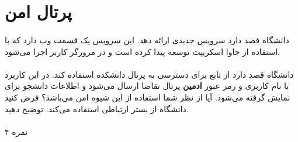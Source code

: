 \documentclass[../main.tex]{subfiles}
\begin{document}
\section{پرتال امن}

\paragraph{}
دانشگاه قصد دارد سرویس جدیدی ارائه دهد.
این سرویس یک قسمت وب دارد که با استفاده از جاوا اسکریپت توسعه پیدا
کرده است و در مرورگر کاربر اجرا می‌شود.

\paragraph{}
دانشگاه قصد دارد از تابع  برای دسترسی به پرتال دانشکده استفاده کند.
در این کاربرد با نام کاربری و رمز عبور \textbf{ادمین} پرتال تقاضا ارسال می‌شود و اطلاعات دانشجو برای نمایش گرفته می‌شود.
آیا از نظر شما استفاده از این شیوه امن می‌باشد؟ فرض کنید دانشگاه از بستر ارتباطی  استفاده می‌کند.
توضیح دهید.

\paragraph{}
۴ نمره
\end{document}

